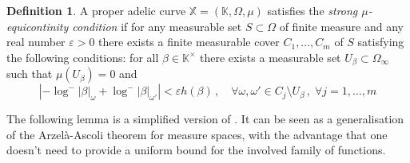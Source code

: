 \documentclass[10 pt,a4paper]{article}
\theoremstyle{plain}
\theoremstyle{definition}
\newtheorem{defn}[thm]{Definition}
\theoremstyle{named}
\begin{document}
\begin{defn}\label{st_muequi}
A proper adelic curve $\mathbb X=(\mathbb K,\Omega, \mu)$ satisfies the \emph{ strong $\mu$-equicontinity condition} if for any measurable set $S\subset\Omega$ of finite measure and any real number $\varepsilon>0$ there exists a finite measurable cover $C_1,\ldots, C_m$ of $S$ satisfying the following conditions: for all $\beta\in\mathbb K^\times$ there exists a measurable set $U_{\beta}\subset\Omega_\infty$ such that $\mu(U_\beta)=0$ and
\[
\left\vert-\log^-\vert\beta\vert_{\omega}+\log^-\vert\beta\vert_{\omega'} \right\vert<\varepsilon h(\beta)\,,\quad \forall \omega,\omega'\in C_j\setminus U_\beta\,,\; \forall j=1,\ldots, m
\]
\end{defn}


The following lemma is a simplified version of \cite[Lemma 8.10]{vo}. It can be seen as a generalisation of the Arzel\`a-Ascoli theorem for measure spaces, with the advantage that one doesn't need to provide a uniform bound for the involved family of functions.
\end{document}
